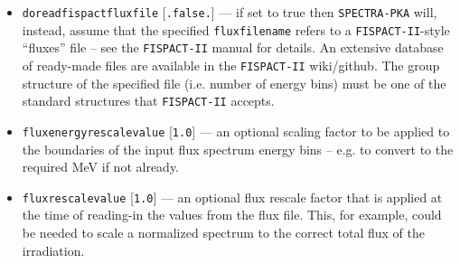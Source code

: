 \documentclass[a4paper]{article}
\begin{document}
\begin{itemize}
\item \texttt{do{\textunderscore}read{\textunderscore}fispact{\textunderscore}flux{\textunderscore}file} [\texttt{.false.}] --- if set to true then \texttt{SPECTRA-PKA} will, instead, assume that the specified  \texttt{flux{\textunderscore}filename} refers to a \texttt{FISPACT-II}-style ``fluxes'' file -- see the \texttt{FISPACT-II} manual for details. An extensive database of ready-made files are available in the \texttt{FISPACT-II} wiki/github. The group structure of the specified file (i.e. number of energy bins) must be one of the standard structures that \texttt{FISPACT-II} accepts.  
    
\item \texttt{flux{\textunderscore}energy{\textunderscore}rescale{\textunderscore}value} [\texttt{1.0}] --- an optional scaling factor to be applied to the boundaries of the input flux spectrum energy bins -- e.g. to convert to the required MeV if not already.

\item \texttt{flux{\textunderscore}rescale{\textunderscore}value} [\texttt{1.0}] --- an optional flux rescale factor that is applied at the time of reading-in the values from the flux file. This, for example, could be needed to scale a normalized spectrum to the correct total flux of the irradiation. 


\end{itemize}
\end{document}
